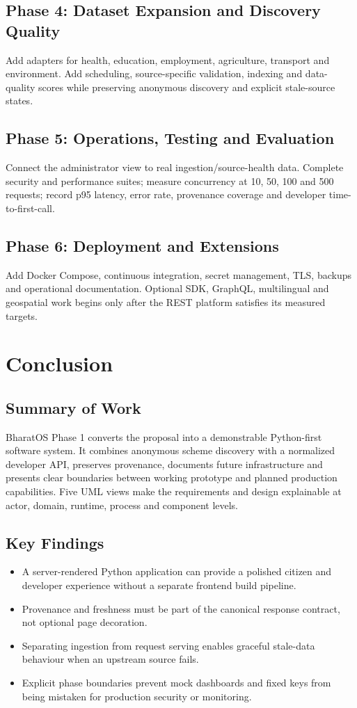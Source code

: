 \documentclass{tietreport}
\begin{document}
\section{Phase 4: Dataset Expansion and Discovery Quality}
Add adapters for health, education, employment, agriculture, transport and environment. Add
scheduling, source-specific validation, indexing and data-quality scores while preserving
anonymous discovery and explicit stale-source states.

\section{Phase 5: Operations, Testing and Evaluation}
Connect the administrator view to real ingestion/source-health data. Complete security and
performance suites; measure concurrency at 10, 50, 100 and 500 requests; record p95 latency,
error rate, provenance coverage and developer time-to-first-call.

\section{Phase 6: Deployment and Extensions}
Add Docker Compose, continuous integration, secret management, TLS, backups and operational
documentation. Optional SDK, GraphQL, multilingual and geospatial work begins only after the
REST platform satisfies its measured targets.

\chapter{Conclusion}

\section{Summary of Work}
BharatOS Phase 1 converts the proposal into a demonstrable Python-first software system. It
combines anonymous scheme discovery with a normalized developer API, preserves provenance,
documents future infrastructure and presents clear boundaries between working prototype and
planned production capabilities. Five UML views make the requirements and design explainable
at actor, domain, runtime, process and component levels.

\section{Key Findings}
\begin{itemize}
  \item A server-rendered Python application can provide a polished citizen and developer
        experience without a separate frontend build pipeline.
  \item Provenance and freshness must be part of the canonical response contract, not optional
        page decoration.
  \item Separating ingestion from request serving enables graceful stale-data behaviour when
        an upstream source fails.
  \item Explicit phase boundaries prevent mock dashboards and fixed keys from being mistaken
        for production security or monitoring.
\end{itemize}
\end{document}
